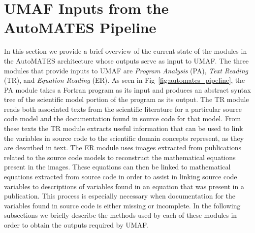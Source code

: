 \section{UMAF Inputs from the AutoMATES Pipeline\label{sec:umaf_inputs}}
In this section we provide a brief overview of the current state of the modules in the AutoMATES architecture whose outputs serve as input to UMAF.
The three modules that provide inputs to UMAF are \textit{Program Analysis} (PA), \textit{Text Reading} (TR), and \textit{Equation Reading} (ER). As seen in Fig~\ref{fig:automates_pipeline}, the PA module takes a Fortran program as its input and produces an abstract syntax tree of the scientific model portion of the program as its output.
The TR module reads both associated texts from the scientific literature for a particular source code model and the documentation found in source code for that model.
From these texts the TR module extracts useful information that can be used to link the variables in source code to the scientific domain concepts represent, as they are described in text.
The ER module uses images extracted from publications related to the source code models to reconstruct the mathematical equations present in the images.
These equations can then be linked to mathematical equations extracted from source code in order to assist in linking source code variables to descriptions of variables found in an equation that was present in a publication.
This process is especially necessary when documentation for the variables found in source code is either missing or incomplete.
In the following subsections we briefly describe the methods used by each of these modules in order to obtain the outputs required by UMAF.

